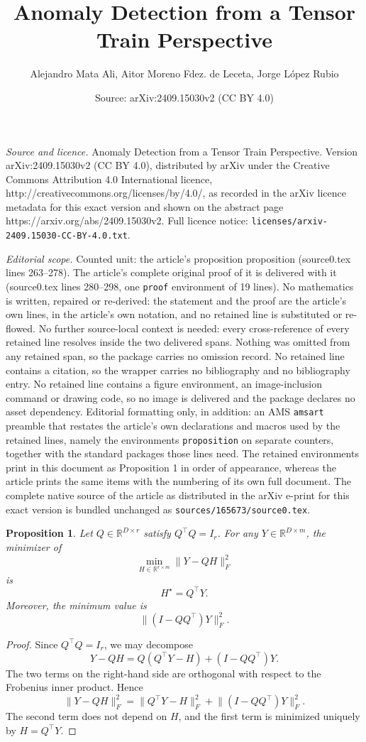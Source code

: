 \documentclass[10pt,a4paper]{amsart}
\title{Anomaly Detection from a Tensor Train Perspective}
\author{Alejandro Mata Ali, Aitor Moreno Fdez. de Leceta, Jorge L\'opez Rubio}
\date{Source: arXiv:2409.15030v2 (CC BY 4.0)}
\newtheorem{proposition}{Proposition}
\begin{document}
\maketitle

\noindent\emph{Source and licence.} Anomaly Detection from a Tensor Train Perspective. Version arXiv:2409.15030v2 (CC BY 4.0), distributed by arXiv under the Creative Commons Attribution 4.0 International licence, http://creativecommons.org/licenses/by/4.0/, as recorded in the arXiv licence metadata for this exact version and shown on the abstract page https://arxiv.org/abs/2409.15030v2. Full licence notice: \texttt{licenses/arxiv-2409.15030-CC-BY-4.0.txt}.\par\smallskip

\noindent\textit{Editorial scope.} Counted unit: the article's proposition proposition (source0.tex lines 263--278). The article's complete original proof of it is delivered with it (source0.tex lines 280--298, one \texttt{proof} environment of 19 lines). No mathematics is written, repaired or re-derived: the statement and the proof are the article's own lines, in the article's own notation, and no retained line is substituted or re-flowed.  No further source-local context is needed: every cross-reference of every retained line resolves inside the two delivered spans.  Nothing was omitted from any retained span, so the package carries no omission record.  No retained line contains a citation, so the wrapper carries no bibliography and no bibliography entry.  No retained line contains a figure environment, an image-inclusion command or drawing code, so no image is delivered and the package declares no asset dependency.  Editorial formatting only, in addition: an AMS \texttt{amsart} preamble that restates the article's own declarations and macros used by the retained lines, namely the environments \texttt{proposition} on separate counters, together with the standard packages those lines need.  The retained environments print in this document as Proposition 1 in order of appearance, whereas the article prints the same items with the numbering of its own full document.  The complete native source of the article as distributed in the arXiv e-print for this exact version is bundled unchanged as \texttt{sources/165673/source0.tex}.
\begin{proposition}
Let $Q\in\mathbb{R}^{D\times r}$ satisfy $Q^\top Q=I_r$. For any
$Y\in\mathbb{R}^{D\times m}$, the minimizer of
\[
    \min_{H\in\mathbb{R}^{r\times m}}
    \lVert Y-QH\rVert_F^2
\]
is
\[
    H^\star = Q^\top Y.
\]
Moreover, the minimum value is
\[
    \lVert (I-QQ^\top)Y\rVert_F^2.
\]
\end{proposition}

\begin{proof}
Since $Q^\top Q=I_r$, we may decompose
\[
    Y-QH
    =
    Q(Q^\top Y-H) + (I-QQ^\top)Y.
\]
The two terms on the right-hand side are orthogonal with respect to the
Frobenius inner product. Hence
\[
    \lVert Y-QH\rVert_F^2
    =
    \lVert Q^\top Y-H\rVert_F^2
    +
    \lVert (I-QQ^\top)Y\rVert_F^2.
\]
The second term does not depend on $H$, and the first term is minimized
uniquely by $H=Q^\top Y$.
\end{proof}
\end{document}
